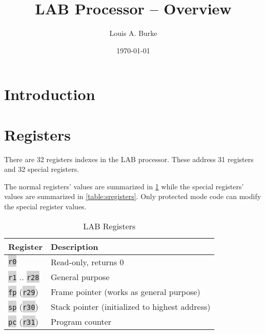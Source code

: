 \documentclass{article}
\title{LAB Processor -- Overview}
\date{\today}
\author{Louis A. Burke}
\newcommand{\labcode}[1]{\colorbox{lightgray}{\lstinline[language=lab]{#1}}}
\begin{document}
\maketitle\clearpage

\section{Introduction}

\section{Registers}

There are 32 registers indexes in the LAB processor. These address 31 registers
and 32 special registers.

The normal registers' values are summarized in \ref{table:registers} while the
special registers' values are summarized in \ref{table:sregisters}. Only
protected mode code can modify the special register values.

\begin{table}[h!]
\centering
\begin{tabular}{ll}
    \toprule Register & Description \\ \midrule
    \labcode{r0} & Read-only, returns 0 \\
    \labcode{r1} .. \labcode{r28} & General purpose \\
    \labcode{fp} (\labcode{r29}) & Frame pointer (works as general purpose) \\
    \labcode{sp} (\labcode{r30}) & Stack pointer (initialized to highest address) \\
    \labcode{pc} (\labcode{r31}) & Program counter \\
\end{tabular}
\caption{LAB Registers}
\label{table:registers}
\end{table}
\end{document}
